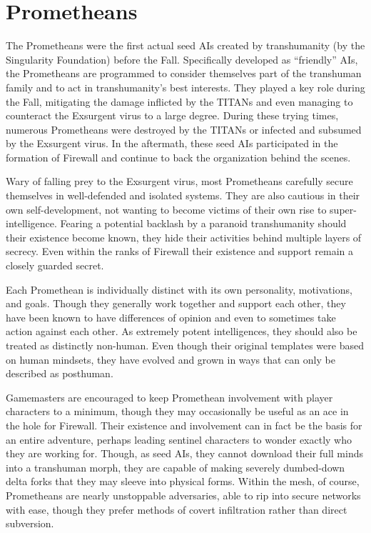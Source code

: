 \section{Prometheans } 

The Prometheans were the first actual seed AIs created by transhumanity (by the Singularity Foundation) before the Fall. Specifically developed as ``friendly'' AIs, the Prometheans are programmed to consider themselves part of the transhuman family and to act in transhumanity's best interests. They played a key role during the Fall, mitigating the damage inflicted by the TITANs and even managing to counteract the Exsurgent virus to a large degree. During these trying times, numerous Prometheans were destroyed by the TITANs or infected and subsumed by the Exsurgent virus. In the aftermath, these seed AIs participated in the formation of Firewall and continue to back the organization behind the scenes. 

Wary of falling prey to the Exsurgent virus, most Prometheans carefully secure themselves in well-defended and isolated systems. They are also cautious in their own self-development, not wanting to become victims of their own rise to super-intelligence. Fearing a potential backlash by a paranoid transhumanity should their existence become known, they hide their activities behind multiple layers of secrecy. Even within the ranks of Firewall their existence and support remain a closely guarded secret. 

Each Promethean is individually distinct with its own personality, motivations, and goals. Though they generally work together and support each other, they have been known to have differences of opinion and even to sometimes take action against each other. As extremely potent intelligences, they should also be treated as distinctly non-human. Even though their original templates were based on human mindsets, they have evolved and grown in ways that can only be described as posthuman. 

Gamemasters are encouraged to keep Promethean involvement with player characters to a minimum, though they may occasionally be useful as an ace in the hole for Firewall. Their existence and involvement can in fact be the basis for an entire adventure, perhaps leading sentinel characters to wonder exactly who they are working for. Though, as seed AIs, they cannot download their full minds into a transhuman morph, they are capable of making severely dumbed-down delta forks that they may sleeve into physical forms. Within the mesh, of course, Prometheans are nearly unstoppable adversaries, able to rip into secure networks with ease, though they prefer methods of covert infiltration rather than direct subversion. 

